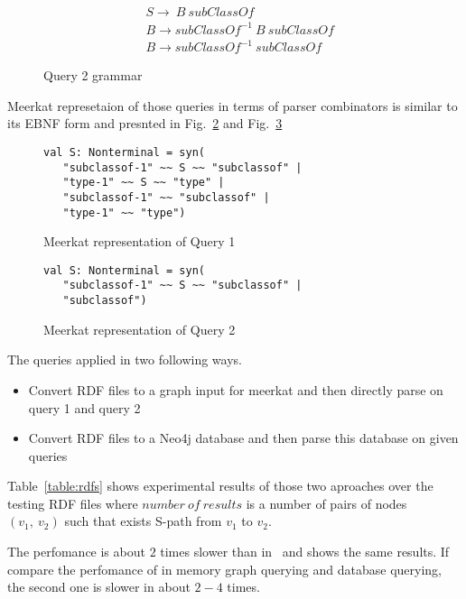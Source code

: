 \begin{figure}[h]
\begin{align*}
& S \rightarrow\ B\ subClassOf\\
& B \rightarrow subClassOf^{-1}\ B\ subClassOf\\
& B \rightarrow subClassOf^{-1}\ subClassOf
\end{align*}
\caption{Query 2 grammar}
\label{fig:query2}
\end{figure}

Meerkat represetaion of those queries in terms of parser combinators is similar to its EBNF form and presnted in Fig.~\ref{fig:query1Meerkat} and Fig.~\ref{fig:query2Meerkat}

\begin{figure}[h]
\begin{lstlisting}
val S: Nonterminal = syn(
   "subclassof-1" ~~ S ~~ "subclassof" |
   "type-1" ~~ S ~~ "type" |
   "subclassof-1" ~~ "subclassof" |
   "type-1" ~~ "type")
\end{lstlisting}
\caption{Meerkat representation of Query 1}
\label{fig:query1Meerkat}
\end{figure}

\begin{figure}[h]
\begin{lstlisting}
val S: Nonterminal = syn(
   "subclassof-1" ~~ S ~~ "subclassof" |
   "subclassof")
\end{lstlisting}
\caption{Meerkat representation of Query 2}
\label{fig:query2Meerkat}
\end{figure}

The queries applied in two following ways.
\begin{itemize}
    \item Convert RDF files to a graph input for meerkat and then directly parse on query 1 and query 2
    \item Convert RDF files to a Neo4j database and then parse this database on given queries
\end{itemize} 

Table~\ref{table:rdfs} shows experimental results of those two aproaches over the testing RDF files where $number\ of\ results$ is a number of pairs of nodes $(v_1,\ v_2)$ such that exists S-path from $v_1$ to $v_2$.

The perfomance is about $2$ times slower than in~\cite{GrigorevR16} and shows the same results.
If compare the perfomance of in memory graph querying and database querying, the second one is slower in about $2-4$ times.


